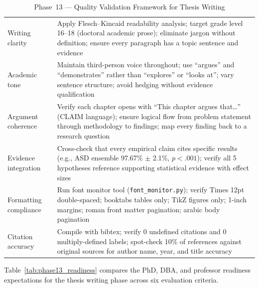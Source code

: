 \begingroup\singlespacing\tablefontsize\tablestripes
\begin{xltabular}{\textwidth}{@{} p{0.15\textwidth} X @{}}
\caption{Phase~13 --- Quality Validation Framework for Thesis Writing}
\label{tab:phase13_quality}\\
\toprule
{} &  \\
\midrule
\endfirsthead
\endhead
\bottomrule
\endlastfoot
Writing clarity           & Apply Flesch--Kincaid readability analysis; target grade level 16--18 (doctoral academic prose); eliminate jargon without definition; ensure every paragraph has a topic sentence and evidence \\
\addlinespace
Academic tone             & Maintain third-person voice throughout; use ``argues'' and ``demonstrates'' rather than ``explores'' or ``looks at''; vary sentence structure; avoid hedging without evidence qualification \\
\addlinespace
Argument coherence        & Verify each chapter opens with ``This chapter argues that\ldots'' (CLAIM language); ensure logical flow from problem statement through methodology to findings; map every finding back to a research question \\
\addlinespace
Evidence integration      & Cross-check that every empirical claim cites specific results (e.g., ASD ensemble 97.67\% $\pm$ 2.1\%, $p < .001$); verify all 5 hypotheses reference supporting statistical evidence with effect sizes \\
\addlinespace
Formatting compliance     & Run font monitor tool (\texttt{font\_monitor.py}); verify Times 12pt double-spaced; booktabs tables only; TikZ figures only; 1-inch margins; roman front matter pagination; arabic body pagination \\
\addlinespace
Citation accuracy         & Compile with bibtex; verify 0 undefined citations and 0 multiply-defined labels; spot-check 10\% of references against original sources for author name, year, and title accuracy \\
\end{xltabular}
\endgroup

\vspace{1.5em}

Table~\ref{tab:phase13_readiness} compares the PhD, DBA, and professor readiness expectations for the thesis writing phase across six evaluation criteria.


